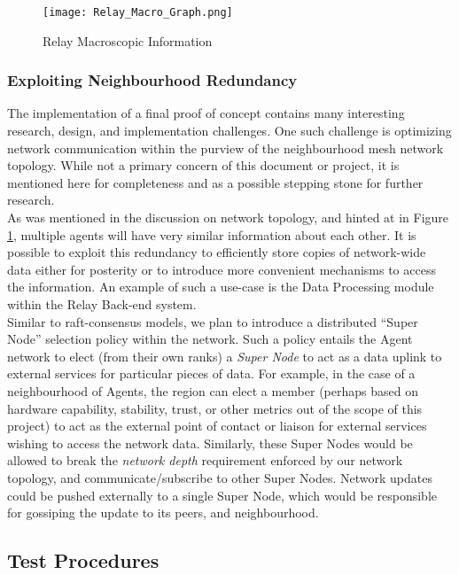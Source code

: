 \documentclass{article}
\begin{document}
\begin{figure}[!htpb]
	\caption{Relay Macroscopic Information}
	\texttt{[image: Relay\_Macro\_Graph.png]}
	\label{fig:Relay_Macro_Graph}
\end{figure}

\subsubsection{Exploiting Neighbourhood Redundancy}

The implementation of a final proof of concept contains many interesting research, design, and implementation challenges.
One such challenge is optimizing network communication within the purview of the neighbourhood mesh network topology.
While not a primary concern of this document or project, it is mentioned here for completeness and as a possible stepping stone for further research.\\

As was mentioned in the discussion on network topology, and hinted at in Figure \ref{fig:Relay_Macro_Graph}, multiple agents will have very similar information about each other.
It is possible to exploit this redundancy to efficiently store copies of network-wide data either for posterity or to introduce more convenient mechanisms to access the information.
An example of such a use-case is the Data Processing module within the Relay Back-end system.\\

Similar to raft-consensus models, we plan to introduce a distributed ``Super Node'' selection policy within the network.
Such a policy entails the Agent network to elect (from their own ranks) a \emph{Super Node} to act as a data uplink to external services for particular pieces of data.
For example, in the case of a neighbourhood of Agents, the region can elect a member (perhaps based on hardware capability, stability, trust, or other metrics out of the scope of this project) to act as the external point of contact or liaison for external services wishing to access the network data.
Similarly, these Super Nodes would be allowed to break the \emph{network depth} requirement enforced by our network topology, and communicate/subscribe to other Super Nodes.
Network updates could be pushed externally to a single Super Node, which would be responsible for gossiping the update to its peers, and neighbourhood.\\

\subsection{Test Procedures}
\end{document}
